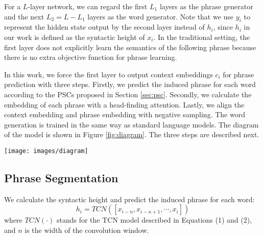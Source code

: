 \documentclass[11pt,a4paper]{article}
\begin{document}
For a $L$-layer network, we can regard the first $L_1$ layers as the phrase generator and the next $L_2 = L - L_1$ layers as the word generator. Note that we use $y_i$ to represent the hidden state output by the second layer instead of $h_i$, since $h_i$ in our work is defined as the syntactic height of $x_i$. In the traditional setting, the first layer does not explicitly learn the semantics of the following phrase because there is no extra objective function for phrase learning.

In this work, we force the first layer to output context embeddings $c_i$ for phrase prediction with three steps. Firstly, we predict the induced phrase for each word according to the PSCs proposed in Section \ref{sec:psc}. Secondly, we calculate the embedding of each phrase with a head-finding attention. Lastly, we align the context embedding and phrase embedding with negative sampling. The word generation is trained in the same way as standard language models. The diagram of the model is shown in Figure \ref{fig:diagram}.
The three steps are described next. 

\begin{figure*}[t]
\centering
\texttt{[image: images/diagram]}
\caption{The 3-step diagram of our approach. The current target word is ``the'', the induced phrase is ``morning flights'', and the next word is ``morning''. The context-phrase and context-word alignments are jointly trained.}
\label{fig:diagram}
\end{figure*}

\subsection{Phrase Segmentation}

We calculate the syntactic height and predict the induced phrase for each word:
\begin{equation}
h_i = TCN([x_{i - n}, x_{i - n + 1}, \cdots, x_i])
\end{equation}
where $TCN(\cdot)$ stands for the TCN model described in Equations (1) and (2), and $n$ is the width of the convolution window.
\end{document}
